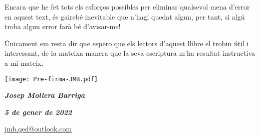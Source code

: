     Encara que he fet tots els esforços possibles per eliminar qualsevol
    mena  d'error en aquest text, és gairebé inevitable que n'hagi quedat algun,
    per tant, si algú troba algun error farà bé d'avisar-me!


   Únicament em resta dir que espero que els lectors d'aquest llibre el trobin    útil i interessant, de la mateixa manera que la seva escriptura m'ha resultat  instructiva a  mi mateix.

\vspace*{0.5cm}
\hfill
\begin{minipage}[b]{35mm}
    \texttt{[image: Pre-firma-JMB.pdf]}
\end{minipage}

{\large

    \hfill \textbf{\textsl{Josep Mollera Barriga}}

    \hfill \textbf{\textsl{5 de gener de 2022}}

    \hfill {\small \href{mailto:jmb.qed@outlook.com}{\faEnvelope\hspace{2mm}jmb.qed@outlook.com} }

}
